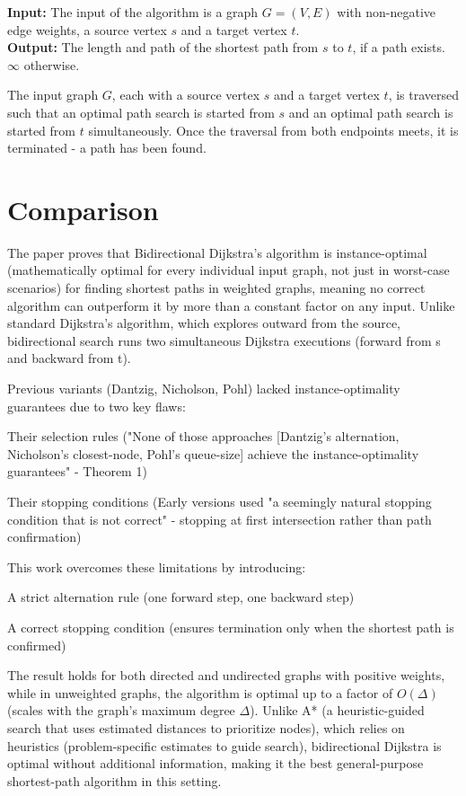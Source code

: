 \documentclass[12pt]{article}
\begin{document}
\noindent\textbf{Input:} The input of the algorithm is a graph \( G = (V, E) \) with non-negative edge weights, a source vertex \( s \) and a target vertex \( t \). \\
\textbf{Output:} The length and path of the shortest path from \( s \) to \( t \), if a path exists. \( \infty \) otherwise.

The input graph \( G \), each with a source vertex \( s \) and a target vertex \( t \), is traversed such that an optimal path search is started from \( s \) and an optimal path search is started from \( t \) simultaneously. Once the traversal from both endpoints meets, it is terminated - a path has been found.

\section{Comparison}
The paper proves that Bidirectional Dijkstra's algorithm is instance-optimal (mathematically optimal for every individual input graph, not just in worst-case scenarios) for finding shortest paths in weighted graphs, meaning no correct algorithm can outperform it by more than a constant factor on any input. Unlike standard Dijkstra's algorithm, which explores outward from the source, bidirectional search runs two simultaneous Dijkstra executions (forward from s and backward from t).

Previous variants (Dantzig, Nicholson, Pohl) lacked instance-optimality guarantees due to two key flaws:

Their selection rules ("None of those approaches [Dantzig's alternation, Nicholson's closest-node, Pohl's queue-size] achieve the instance-optimality guarantees" - Theorem 1)

Their stopping conditions (Early versions used "a seemingly natural stopping condition that is not correct" - stopping at first intersection rather than path confirmation)

This work overcomes these limitations by introducing:

A strict alternation rule (one forward step, one backward step)

A correct stopping condition (ensures termination only when the shortest path is confirmed)

The result holds for both directed and undirected graphs with positive weights, while in unweighted graphs, the algorithm is optimal up to a factor of \( O(\Delta) \) (scales with the graph's maximum degree \( \Delta \)). Unlike A* (a heuristic-guided search that uses estimated distances to prioritize nodes), which relies on heuristics (problem-specific estimates to guide search), bidirectional Dijkstra is optimal without additional information, making it the best general-purpose shortest-path algorithm in this setting.
\end{document}
